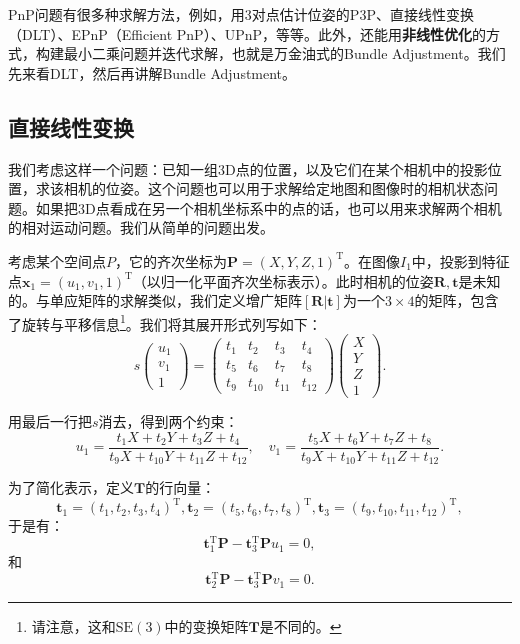 PnP问题有很多种求解方法，例如，用3对点估计位姿的P3P\textsuperscript{\cite{GaoHouTangEtAl2003}}、直接线性变换（DLT）、EPnP（Efficient PnP）\textsuperscript{\cite{LepetitMoreno-NoguerFua2008}}、UPnP\textsuperscript{\cite{Penate-SanchezAndrade-CettoMoreno-Noguer2013}}，等等。此外，还能用\textbf{非线性优化}的方式，构建最小二乘问题并迭代求解，也就是万金油式的Bundle Adjustment。我们先来看DLT，然后再讲解Bundle Adjustment。

\subsection{直接线性变换}
我们考虑这样一个问题：已知一组3D点的位置，以及它们在某个相机中的投影位置，求该相机的位姿。这个问题也可以用于求解给定地图和图像时的相机状态问题。如果把3D点看成在另一个相机坐标系中的点的话，也可以用来求解两个相机的相对运动问题。我们从简单的问题出发。

考虑某个空间点$P$，它的齐次坐标为${\bm{P}}=(X,Y,Z,1)^{\mathrm{T}}$。在图像$I_{1}$中，投影到特征点${\bm{x}}_{1}=(u_{1},v_{1},1)^{\mathrm{T}}$（以归一化平面齐次坐标表示）。此时相机的位姿$\bm{R}, \bm{t}$是未知的。与单应矩阵的求解类似，我们定义增广矩阵$[\bm{R}|\bm{t}]$为一个$3\times 4$的矩阵，包含了旋转与平移信息\footnote{请注意，这和$\mathrm{SE}(3)$中的变换矩阵$\bm{T}$是不同的。}。我们将其展开形式列写如下：
\begin{equation}
s
\begin{pmatrix}
u_{1} \\ v_{1} \\ 1
\end{pmatrix}
=
\begin{pmatrix}
t_{1} & t_{2} & t_{3} & t_{4}\\ 
t_{5} & t_{6} & t_{7} & t_{8}\\ 
t_{9} & t_{10} & t_{11} & t_{12}
\end{pmatrix}
\begin{pmatrix}
X \\ Y \\ Z \\ 1
\end{pmatrix}.
\end{equation}

用最后一行把$s$消去，得到两个约束：
\[
u_{1}=\frac{t_{1}X+t_{2}Y+t_{3}Z+t_{4}}{t_{9}X+t_{10}Y+t_{11}Z+t_{12}},\quad
v_{1}=\frac{t_{5}X+t_{6}Y+t_{7}Z+t_{8}}{t_{9}X+t_{10}Y+t_{11}Z+t_{12}}.
\]

为了简化表示，定义$\bm{T}$的行向量：
\[
\bm{t}_{1}=(t_{1},t_{2},t_{3},t_{4})^\mathrm{T},
\bm{t}_{2}=(t_{5},t_{6},t_{7},t_{8})^\mathrm{T},
\bm{t}_{3}=(t_{9},t_{10},t_{11},t_{12})^\mathrm{T},
\]
于是有：
\[
\bm{t}_1^\mathrm{T}\bm{P}-\bm{t}_3^\mathrm{T}\bm{P} u_1=0,
\]
和
\[
\bm{t}_2^\mathrm{T}\bm{P}-\bm{t}_3^\mathrm{T}\bm{P} v_1=0.
\]

